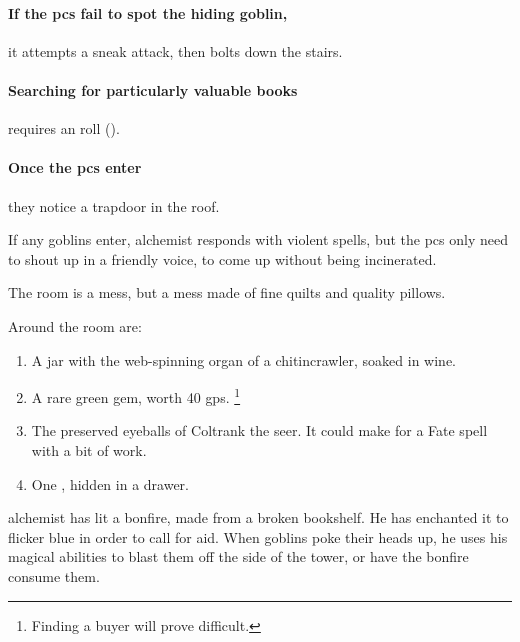 \begin{multicols}{2}

\paragraph{If the \glspl{pc} fail to spot the hiding goblin,}
it attempts a sneak attack, then bolts down the stairs.

\paragraph{Searching for particularly valuable books}
requires an  roll (\tn[12]).

\paragraph{Once the \glspl{pc} enter}
they notice a trapdoor in the roof.

If any goblins enter, \gls{alchemist} responds with violent spells, but the \glspl{pc} only need to shout up in a friendly voice, to come up without being incinerated.


The room is a mess, but a mess made of fine quilts and quality pillows.

Around the room are:

\begin{enumerate}

  \item{A jar with the web-spinning organ of a chitincrawler, soaked in wine.}
  \item{A rare green gem, worth 40 \glspl{gp}.%
  \footnote{Finding a buyer will prove difficult.}}
  \item{The preserved eyeballs of Coltrank the seer.
  It could make  for a Fate spell with a bit of work.}
  \item
  One \lootTalisman, hidden in a drawer.

  \showTalisman

\end{enumerate}


\begin{exampletext}
  \Gls{alchemist} has lit a bonfire, made from a broken bookshelf.
  He has enchanted it to flicker blue in order to call for aid.
  When goblins poke their heads up, he uses his magical abilities to blast them off the side of the tower, or have the bonfire consume them.
\end{exampletext}


\end{multicols}

